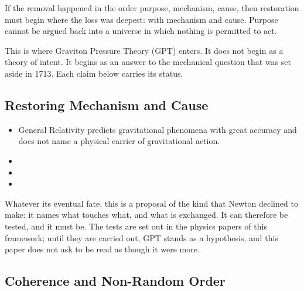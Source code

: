 \documentclass[11pt,a4paper]{article}
\begin{document}
If the removal happened in the order purpose, mechanism, cause, then restoration must begin where the loss was deepest: with mechanism and cause. Purpose cannot be argued back into a universe in which nothing is permitted to act.

This is where Graviton Pressure Theory (GPT) enters. It does not begin as a theory of intent. It begins as an answer to the mechanical question that was set aside in 1713. Each claim below carries its status.

\subsection{Restoring Mechanism and Cause}

\begin{itemize}
  \item General Relativity predicts gravitational phenomena with great accuracy and does not name a physical carrier of gravitational action.
  \item {}
  \item {}
  \item {}
\end{itemize}

Whatever its eventual fate, this is a proposal of the kind that Newton declined to make: it names what touches what, and what is exchanged. It can therefore be tested, and it must be. The tests are set out in the physics papers of this framework; until they are carried out, GPT stands as a hypothesis, and this paper does not ask to be read as though it were more.

\subsection{Coherence and Non-Random Order}

\end{document}

